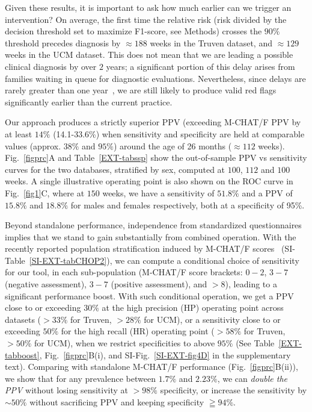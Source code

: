 \documentclass[onecolumn,10pt]{IEEEtran}
\begin{document}
Given these results, it is important to ask how much earlier can we trigger an intervention? On average,  the first time the relative risk (risk divided by the decision threshold set to maximize F1-score, see Methods) crosses the $90\%$ threshold precedes  diagnosis by  $\approx 188$ weeks in the Truven dataset, and $\approx 129$ weeks in the UCM dataset. This does not mean that we are   leading a possible clinical diagnosis by over $2$ years; a significant portion of this delay arises from families waiting in queue for diagnostic evaluations. Nevertheless, since delays are rarely greater than   one year~\cite{gordon2016whittling},  we are still likely to produce valid red flags significantly earlier than the current practice.%

Our approach produces a strictly superior PPV (exceeding M-CHAT/F PPV by at  least $14\%$ (14.1-33.6\%) when sensitivity and specificity are held at comparable values (approx. $38\%$ and $95\%$) around the age of 26 months ($\approx 112$ weeks). Fig.~\ref{figprc}A and Table~\ref{EXT-tabssp} show  the out-of-sample  PPV vs sensitivity curves   for the two databases, stratified by sex, computed at $100$, $112$ and $100$ weeks. A single illustrative operating point is also shown on the ROC curve in Fig.~\ref{fig1}C, where at $150$ weeks, we have a sensitivity of $51.8\%$ and a PPV of $15.8\%$ and $18.8\%$ for males and females respectively, both at a specificity of 95\%. 

Beyond standalone performance, independence from standardized questionnaires implies that we stand to gain substantially  from combined operation. With the recently reported population stratification induced by M-CHAT/F scores~\cite{pmid31562252} (SI-Table~\ref{SI-EXT-tabCHOP2}), we can compute a conditional choice of sensitivity  for our tool, in each sub-population (M-CHAT/F score brackets: $0-2$, $3-7$ (negative assessment), $3-7$ (positive assessment), and $>8$), leading to a  significant performance boost. With such conditional operation, we get a PPV close to or exceeding $30\%$ at the high precision (HP) operating point across datasets ($>33\%$ for Truven, $>28\%$ for UCM), or a sensitivity close to or exceeding $50\%$ for the high recall (HR) operating point ($>58\%$ for  Truven, $>50\%$ for UCM), when we restrict specificities to above $95\%$ (See Table~\ref{EXT-tabboost}, Fig.~\ref{figprc}B(i), and SI-Fig.~\ref{SI-EXT-fig4D}  in the supplementary text). Comparing   with standalone M-CHAT/F performance (Fig.~\ref{figprc}B(ii)), we show that for any prevalence between $1.7\%$ and $2.23\%$, we can   \textit{double the PPV} without losing sensitivity at $>98\%$ specificity, or increase the sensitivity by $\sim 50\%$ without sacrificing PPV and  keeping specificity $\geqq 94\%$.%
\end{document}
